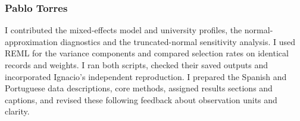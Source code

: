 \subsubsection*{Pablo Torres}
I contributed the mixed-effects model and university profiles, the normal-approximation diagnostics and the truncated-normal sensitivity analysis. I used REML for the variance components and compared selection rates on identical records and weights. I ran both scripts, checked their saved outputs and incorporated Ignacio's independent reproduction. I prepared the Spanish and Portuguese data descriptions, core methods, assigned results sections and captions, and revised these following feedback about observation units and clarity.
